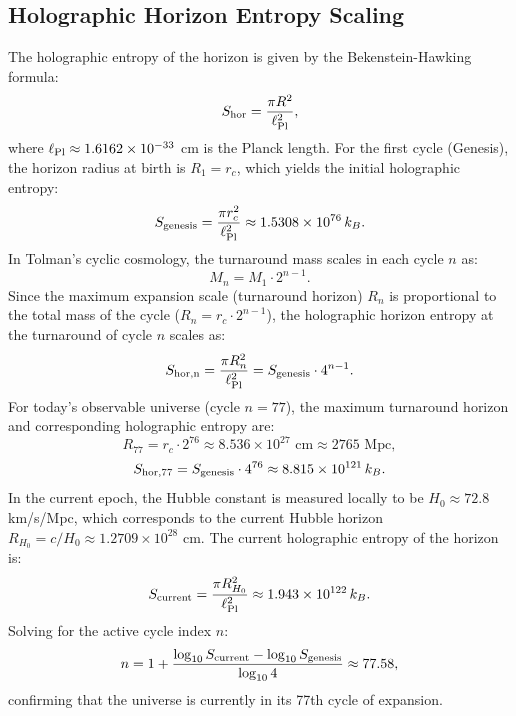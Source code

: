 \documentclass[12pt,a4paper]{article}
\theoremstyle{plain}
\theoremstyle{definition}
\theoremstyle{remark}
\begin{document}
\subsection{Holographic Horizon Entropy Scaling}
The holographic entropy of the horizon is given by the Bekenstein-Hawking formula:
\begin{equation}
  S_{\rm hor} = \frac{\pi R^2}{\ell_{\rm Pl}^2},
\end{equation}
where $\ell_{\rm Pl} \approx 1.6162 \times 10^{-33}$ cm is the Planck length.
For the first cycle (Genesis), the horizon radius at birth is $R_1 = r_c$, which yields the initial holographic entropy:
\begin{equation}
  S_{\rm genesis} = \frac{\pi r_c^2}{\ell_{\rm Pl}^2} \approx 1.5308 \times 10^{76} \, k_B.
\end{equation}
In Tolman's cyclic cosmology, the turnaround mass scales in each cycle $n$ as:
\begin{equation}
  M_n = M_1 \cdot 2^{n-1}.
\end{equation}
Since the maximum expansion scale (turnaround horizon) $R_n$ is proportional to the total mass of the cycle ($R_n = r_c \cdot 2^{n-1}$), the holographic horizon entropy at the turnaround of cycle $n$ scales as:
\begin{equation}
  S_{\rm hor, n} = \frac{\pi R_n^2}{\ell_{\rm Pl}^2} = S_{\rm genesis} \cdot 4^{n-1}.
\end{equation}
For today's observable universe (cycle $n = 77$), the maximum turnaround horizon and corresponding holographic entropy are:
\begin{equation}
  R_{77} = r_c \cdot 2^{76} \approx 8.536 \times 10^{27} \text{ cm} \approx 2765 \text{ Mpc},
\end{equation}
\begin{equation}
  S_{\rm hor, 77} = S_{\rm genesis} \cdot 4^{76} \approx 8.815 \times 10^{121} \, k_B.
\end{equation}
In the current epoch, the Hubble constant is measured locally to be $H_0 \approx 72.8$ km/s/Mpc, which corresponds to the current Hubble horizon $R_{H_0} = c/H_0 \approx 1.2709 \times 10^{28}$ cm. The current holographic entropy of the horizon is:
\begin{equation}
  S_{\rm current} = \frac{\pi R_{H_0}^2}{\ell_{\rm Pl}^2} \approx 1.943 \times 10^{122} \, k_B.
\end{equation}
Solving for the active cycle index $n$:
\begin{equation}
  n = 1 + \frac{\log_{10} S_{\rm current} - \log_{10} S_{\rm genesis}}{\log_{10} 4} \approx 77.58,
\end{equation}
confirming that the universe is currently in its 77th cycle of expansion.
\end{document}
